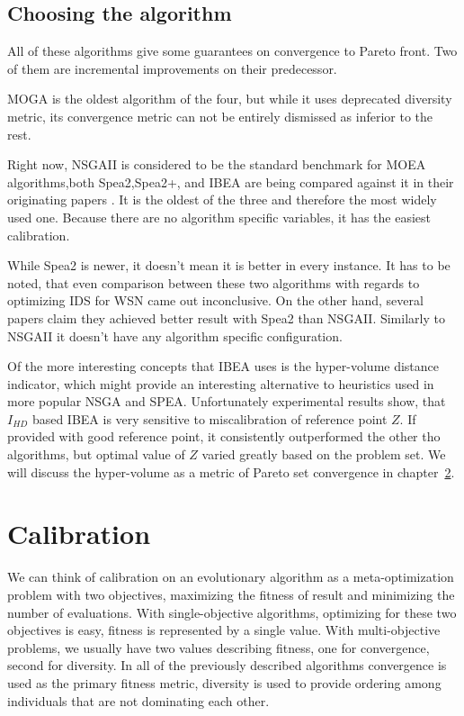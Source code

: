 \documentclass[12pt,oneside]{fithesis2}
\begin{document}
\section{Choosing the algorithm}
All of these algorithms give some guarantees on convergence to Pareto front. Two of them are incremental improvements on their predecessor. 

MOGA is the oldest algorithm of the four, but while it uses deprecated diversity metric, its convergence metric can not be entirely dismissed as inferior to the rest.

Right now, NSGAII is considered to be the standard benchmark for MOEA algorithms,both Spea2,Spea2+, and IBEA are being compared against it in their originating papers . It is the oldest of the three and therefore the most widely used one. Because there are no algorithm specific variables, it has the easiest calibration.
       
While Spea2 is newer, it doesn't mean it is better in every instance. It has to be noted, that even comparison between these two algorithms with regards to optimizing IDS for WSN came out inconclusive.\cite{stehl2013opt} On the other hand, several papers claim they achieved better result with Spea2 than NSGAII. Similarly to NSGAII it doesn't have any algorithm specific configuration. 

Of the more interesting concepts that IBEA uses is the hyper-volume distance indicator, which might provide an interesting alternative to heuristics used in more popular NSGA and SPEA. Unfortunately experimental results show\cite{zitzler2004indicator}, that $I_{HD}$ based IBEA is very sensitive to miscalibration of reference point $Z$. If provided with good reference point, it consistently outperformed the other tho algorithms, but optimal value of $Z$ varied greatly based on the problem set. We will discuss the hyper-volume as a metric of Pareto set convergence in chapter~\ref{chap:calib}.

\chapter{Calibration}
\label{chap:calib}
We can think of calibration on an evolutionary algorithm as a meta-optimization problem with two objectives, maximizing the fitness of result and minimizing the number of evaluations.
With single-objective algorithms, optimizing for these two objectives is easy, fitness is represented by a single value.
With multi-objective problems, we usually have two values describing fitness, one for convergence, second for diversity. In all of the previously described algorithms convergence is used as the primary fitness metric, diversity is used to provide ordering among individuals that are not dominating each other.
\end{document}
